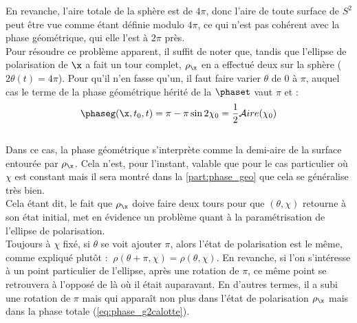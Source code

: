 En revanche, l'aire totale de la sphère est de $4\pi$, donc l'aire de toute surface de $S^2$ peut être vue comme étant définie modulo $4\pi$, ce qui n'est pas cohérent avec la phase géométrique, qui elle l'est à $2\pi$ près.
\\
Pour résoudre ce problème apparent, il suffit de noter que, tandis que l’ellipse de polarisation de $\x$ a fait un tour complet, 
$\rho_{\x}$ en a effectué deux sur la sphère ($2\theta(t) = 4\pi$).
Pour qu'il n'en fasse qu'un, il faut faire varier $\theta$ de 0 à $\pi$, auquel cas le terme de la phase géométrique hérité de la $\phaset$ vaut $\pi$ et :
\begin{equation} \label{eq:phase_g2calotte}
\phaseg(\x, t_0, t) = \pi - \pi\sin 2\chi_0 = \frac{1}{2}\mathcal{A}ire(\chi_0)
\end{equation}
\\
Dans ce cas, la phase géométrique s'interprète comme la demi-aire de la surface entourée par $\rho_{\x}$. Cela n'est, pour l'instant, valable que pour le cas particulier où $\chi$ est constant mais il sera montré dans la \cref{part:phase_geo} que cela se généralise très bien.
\\

Cela étant dit, le fait que $\rho_{\x}$ doive faire deux tours pour que $(\theta,\chi)$ retourne à son état initial, met en évidence un problème quant à la paramétrisation de l'ellipse de polarisation.
\\
Toujours à $\chi$ fixé, si $\theta$ se voit ajouter $\pi$, alors l'état de polarisation est le même, comme expliqué plutôt : $\ \rho(\theta+\pi,\chi) = \rho(\theta, \chi)$.
En revanche, si l'on s'intéresse à un point particulier de l'ellipse, après une rotation de $\pi$, ce même point se retrouvera à l'opposé de là où il était auparavant. 
En d'autres termes, il a subi une rotation de $\pi$ mais qui apparaît non plus dans l'état de polarisation $\rho_{\x}$ mais dans la phase totale (\cref{eq:phase_g2calotte}).
\\
\\




